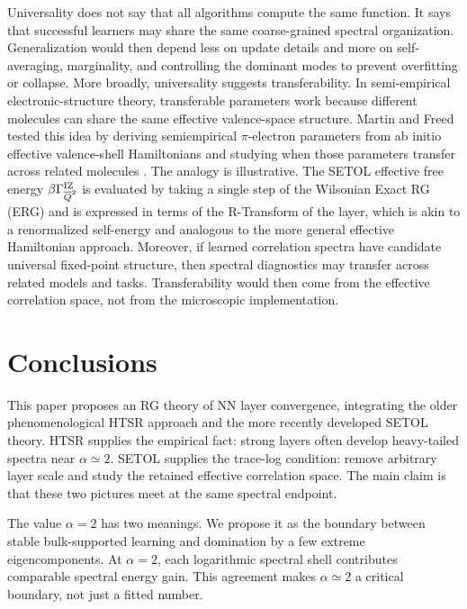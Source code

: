 \documentclass[10pt,twocolumn]{article}
\newcommand{\IZQ}{\beta\Gamma_{\overline Q^2}^{\rm IZ}}
\begin{document}
Universality does not say that all algorithms compute the same function. It says that successful learners may share the same coarse-grained spectral organization. Generalization would then depend less on update details and more on self-averaging, marginality, and controlling the dominant modes to prevent overfitting or collapse.
More broadly, universality suggests transferability. In semi-empirical electronic-structure theory, transferable parameters work because different molecules can share the same effective valence-space structure. Martin and Freed tested this idea by deriving semiempirical $\pi$-electron parameters from ab initio effective valence-shell Hamiltonians and studying when those parameters transfer across related molecules \cite{MartinFreed1994I,Martin1996SchiffBases,Martin1996LargeSchiffBases}.
The analogy is illustrative. The SETOL effective free energy $\IZQ$ is evaluated by taking a single step of the
Wilsonian Exact RG (ERG) and is expressed in terms of the R-Transform of the layer, which is akin to a renormalized self-energy
and analogous to the more general effective Hamiltonian approach.
Moreover, if learned correlation spectra have candidate universal fixed-point structure, then spectral diagnostics may transfer across related models and tasks. Transferability would then come from the effective correlation space, not from the microscopic implementation.


\clearpage
\section{Conclusions}
\label{sxn:conclusions}

This paper proposes an RG theory of NN layer convergence, integrating the older phenomenological HTSR approach and the more recently developed
SETOL theory. HTSR supplies the empirical fact: strong layers often develop heavy-tailed spectra near $\alpha\simeq2$. SETOL supplies the trace-log condition: remove arbitrary layer scale and study the retained effective correlation space. The main claim is that these two pictures meet at the same spectral endpoint.

The value $\alpha=2$ has two meanings.
We propose it as the boundary between stable bulk-supported learning and domination by a few extreme eigencomponents.
At $\alpha=2$, each logarithmic spectral shell contributes comparable spectral energy gain.
This agreement makes $\alpha\simeq2$ a critical boundary, not just a fitted number.
\end{document}
